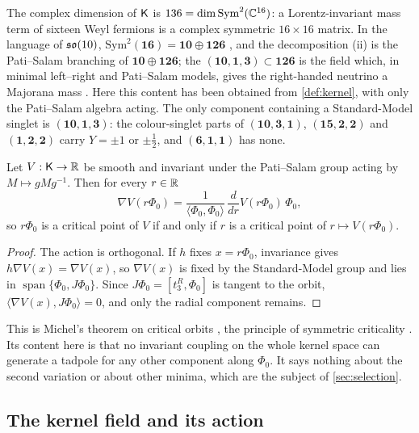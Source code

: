 The complex dimension of $\mathsf K$ is $136=\dim\mathrm{Sym}^2(\mathbb{C}^{16})$: a Lorentz-invariant mass term of sixteen Weyl fermions is a complex
symmetric $16\times16$ matrix. In the language of $\mathfrak{so}(10)$, $\mathrm{Sym}^2(\mathbf{16})=\mathbf{10}\oplus\mathbf{126}$ \cite{Slansky}, and the
decomposition (ii) is the Pati--Salam branching of $\mathbf{10}\oplus\mathbf{126}$; the $(\mathbf{10},\mathbf1,\mathbf3)\subset\mathbf{126}$ is the field which, in
minimal left--right and Pati--Salam models, gives the right-handed neutrino a Majorana mass \cite{MohapatraSenjanovic80,MohapatraSenjanovic81}.
Here this content has been obtained from \cref{def:kernel}, with only the Pati--Salam algebra acting. The only component containing a
Standard-Model singlet is $(\mathbf{10},\mathbf1,\mathbf3)$: the colour-singlet parts of $(\mathbf{10},\mathbf3,\mathbf1)$, $(\mathbf{15},\mathbf2,\mathbf2)$ and $(\mathbf1,\mathbf2,\mathbf2)$ carry
$Y=\pm1$ or $\pm\tfrac12$, and $(\mathbf6,\mathbf1,\mathbf1)$ has none.

\begin{theorem}
\label{thm:symcrit}
Let $V:\mathsf K\to\mathbb{R}$ be smooth and invariant under the Pati--Salam group acting by $M\mapsto gMg^{-1}$. Then for every $r\in\mathbb{R}$
\[
\nabla V(r\Phi_0)=\frac1{\langle\Phi_0,\Phi_0\rangle}\,\frac{d}{dr}V(r\Phi_0)\,\Phi_0 ,
\]
so $r\Phi_0$ is a critical point of $V$ if and only if $r$ is a critical point of $r\mapsto V(r\Phi_0)$.
\end{theorem}

\begin{proof}
The action is orthogonal. If $h$ fixes $x=r\Phi_0$, invariance gives $h\nabla V(x)=\nabla V(x)$, so $\nabla V(x)$ is fixed by the Standard-Model
group and lies in $\operatorname{span}\{\Phi_0,J\Phi_0\}$. Since $J\Phi_0=[t^R_3,\Phi_0]$ is tangent to the orbit, $\langle\nabla V(x),J\Phi_0\rangle=0$, and
only the radial component remains.
\end{proof}

This is Michel's theorem on critical orbits \cite{Michel71}, the principle of symmetric criticality \cite{Palais79}. Its content here is that no
invariant coupling on the whole kernel space can generate a tadpole for any other component along $\Phi_0$. It says nothing about the second
variation or about other minima, which are the subject of \cref{sec:selection}.

\subsection{The kernel field and its action}

